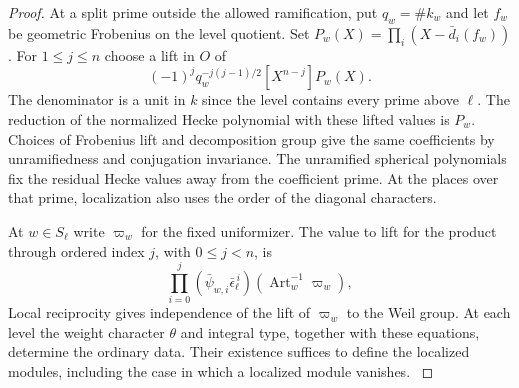 \begin{proof}
At a split prime outside the allowed ramification, put
\(q_w=\# k_w\) and let \(f_w\) be geometric Frobenius on the
level quotient. Set \(P_w(X)=\prod_i(X-\bar d_i(f_w))\).
For \(1\le j\le n\) choose a lift in \(O\) of
\[
   (-1)^j q_w^{-j(j-1)/2}[X^{n-j}]P_w(X).
\]
The denominator is a unit in \(k\) since the level contains
every prime above \(\ell\). The reduction of the normalized
Hecke polynomial with these lifted values is \(P_w\).
Choices of Frobenius lift and decomposition group give the same
coefficients by unramifiedness and conjugation invariance.
The unramified spherical polynomials fix the residual Hecke values away from the coefficient prime. At the places over that prime, localization also uses the order of the diagonal characters.

At \(w\in S_\ell\) write \(\varpi_w\) for the fixed uniformizer.
The value to lift for the product through
ordered index \(j\), with \(0\le j<n\), is
\[
   \prod_{i=0}^{j}(\bar\psi_{w,i}\bar\epsilon_\ell^{\,i})
                         (\operatorname{Art}_w^{-1}\varpi_w),
\]
Local reciprocity
gives independence of the lift of \(\varpi_w\) to the Weil group.
 At each level the weight character \(\theta\) and integral
type, together with these equations, determine the ordinary data. Their
existence suffices to define the localized modules, including
the case in which a localized module vanishes. \label{cor:ordinary-level-data-2}
\end{proof}
